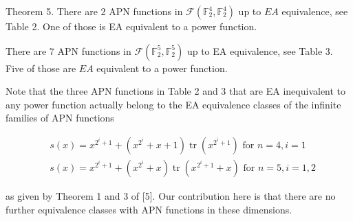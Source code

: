 \documentclass[10pt]{article}
\begin{document}
Theorem 5. There are 2 APN functions in $\mathcal{F}\left(\mathbb{F}_{2}^{4}, \mathbb{F}_{2}^{4}\right)$ up to $E A$ equivalence, see Table 2. One of those is EA equivalent to a power function.

There are 7 APN functions in $\mathcal{F}\left(\mathbb{F}_{2}^{5}, \mathbb{F}_{2}^{5}\right)$ up to EA equivalence, see Table 3. Five of those are $E A$ equivalent to a power function.

Note that the three APN functions in Table 2 and 3 that are EA inequivalent to any power function actually belong to the EA equivalence classes of the infinite families of APN functions


\begin{align*}
& s(x)=x^{2^{i}+1}+\left(x^{2^{i}}+x+1\right) \operatorname{tr}\left(x^{2^{i}+1}\right) \text { for } n=4, i=1  \tag{5}\\
& s(x)=x^{2^{i}+1}+\left(x^{2^{i}}+x\right) \operatorname{tr}\left(x^{2^{i}+1}+x\right) \text { for } n=5, i=1,2 \tag{6}
\end{align*}


as given by Theorem 1 and 3 of [5]. Our contribution here is that there are no further equivalence classes with APN functions in these dimensions.
\end{document}
